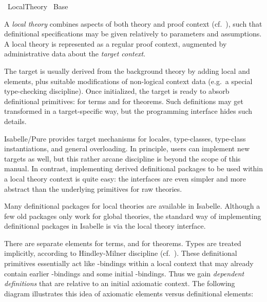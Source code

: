 %
\begin{isabellebody}%
\def\isabellecontext{Local{\isacharunderscore}Theory}%
%
\isadelimtheory
%
\endisadelimtheory
%
\isatagtheory
{}\isamarkupfalse%
\ Local{\isacharunderscore}Theory\isanewline
{}\ Base\isanewline
{}%
\endisatagtheory
{\isafoldtheory}%
%
\isadelimtheory
%
\endisadelimtheory
%
\isamarkuptrue%
%
\begin{isamarkuptext}%
A \emph{local theory} combines aspects of both theory and proof
  context (cf.\ ), such that definitional
  specifications may be given relatively to parameters and
  assumptions.  A local theory is represented as a regular proof
  context, augmented by administrative data about the \emph{target
  context}.

  The target is usually derived from the background theory by adding
  local \isa{{\isasymFIX}} and \isa{{\isasymASSUME}} elements, plus
  suitable modifications of non-logical context data (e.g.\ a special
  type-checking discipline).  Once initialized, the target is ready to
  absorb definitional primitives: \isa{{\isasymDEFINE}} for terms and
  \isa{{\isasymNOTE}} for theorems.  Such definitions may get
  transformed in a target-specific way, but the programming interface
  hides such details.

  Isabelle/Pure provides target mechanisms for locales, type-classes,
  type-class instantiations, and general overloading.  In principle,
  users can implement new targets as well, but this rather arcane
  discipline is beyond the scope of this manual.  In contrast,
  implementing derived definitional packages to be used within a local
  theory context is quite easy: the interfaces are even simpler and
  more abstract than the underlying primitives for raw theories.

  Many definitional packages for local theories are available in
  Isabelle.  Although a few old packages only work for global
  theories, the standard way of implementing definitional packages in
  Isabelle is via the local theory interface.%
\end{isamarkuptext}%
\isamarkuptrue%
%
\isamarkuptrue%
%
\begin{isamarkuptext}%
There are separate elements  for terms, and
   for theorems.  Types are treated
  implicitly, according to Hindley-Milner discipline (cf.\
  ).  These definitional primitives essentially
  act like -bindings within a local context that may
  already contain earlier \isa{let}-bindings and some initial
  \isa{{\isasymlambda}}-bindings.  Thus we gain \emph{dependent definitions}
  that are relative to an initial axiomatic context.  The following
  diagram illustrates this idea of axiomatic elements versus
  definitional elements:


\end{isamarkuptext}
\end{isabellebody}

